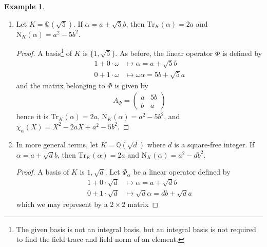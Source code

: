 \documentclass[a4paper]{book}
\theoremstyle{definition}
\newtheorem{example}{Example}[definition]
\begin{document}
\begin{example}
\begin{enumerate}
\begin{proof}
\begin{align*}
\begin{pmatrix}
                a & 2b \\
                b & a
            \end{pmatrix} \text{.}
        \end{align*}
        So we have \(\mathrm{Tr}_K(\alpha) = 2a\), \(\mathrm{N}_K(\alpha) = a^2 - 2b^2\), and \(\chi_\alpha = X^2 - 2a X + a^2 - 2b^2\).
    \end{proof}
    \item Let \(K = \mathbb{Q}(\sqrt{5})\). If \(\alpha = a + \sqrt{5}b\), then \(\mathrm{Tr}_K(\alpha) = 2a\) and \(\mathrm{N}_K(\alpha) = a^2 - 5b^2\).
    \begin{proof}
        A basis\footnote{ The given basis is not an integral basis, but an integral basis is not required to find the field trace and field norm of an element.} of \(K\) is \(\{1, \sqrt{5}\}\). As before, the linear operator \(\Phi\) is defined by
        \begin{align*}
            1 + 0 \cdot \omega &\mapsto \alpha = a + \sqrt{5} b \\
            0 + 1 \cdot \omega &\mapsto \omega \alpha = 5b + \sqrt{5}a
        \end{align*}
        and the matrix belonging to \(\Phi\) is given by
        \begin{align*}
            A_\Phi = \begin{pmatrix}
                a & 5b \\
                b & a
            \end{pmatrix}
        \end{align*}
        hence it is \(\mathrm{Tr}_K(\alpha) = 2a\), \(\mathrm{N}_K(\alpha) = a^2 - 5b^2\), and \(\chi_\alpha(X) = X^2 - 2aX + a^2 - 5b^2\).
    \end{proof}
    \item In more general terms, let \(K = \mathbb{Q}(\sqrt{d})\) where \(d\) is a square-free integer. If \(\alpha = a + \sqrt{d}b\), then \(\mathrm{Tr}_K(\alpha) = 2a\) and \(\mathrm{N}_K(\alpha) = a^2 - db^2\).
    \begin{proof}
        A basis of \(K\) is \({1, \sqrt{d}}\). Let \(\Phi_\alpha\) be a linear operator defined by
        \begin{align*}
            1 + 0 \cdot \sqrt{d} &\mapsto \alpha = a + \sqrt{d}b \\
            0 + 1 \cdot \sqrt{d} &\mapsto \sqrt{d}\alpha = db + \sqrt{d}a
        \end{align*}
        which we may represent by a \(2 \times 2\) matrix

\end{proof}
\end{enumerate}
\end{example}
\end{document}
